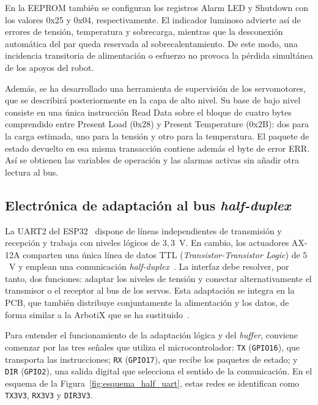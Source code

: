 En la EEPROM también se configuran los registros Alarm LED y Shutdown con los
valores 0x25 y 0x04,
respectivamente. El indicador luminoso advierte así de errores de tensión,
temperatura y sobrecarga, mientras que la desconexión automática del par queda
reservada al sobrecalentamiento. De este modo, una incidencia transitoria de
alimentación o esfuerzo no provoca la pérdida simultánea de los apoyos del
robot.

Además, se ha desarrollado una herramienta de supervisión de los servomotores,
que se describirá posteriormente en la capa de alto nivel. Su base de bajo nivel
consiste en una única instrucción Read Data sobre el bloque de cuatro bytes
comprendido entre Present Load (0x28) y Present Temperature (0x2B): dos para la
carga estimada, uno para la tensión y otro para la temperatura. El paquete de
estado devuelto en esa misma transacción contiene además el byte de error ERR.
Así se obtienen las variables de operación y las alarmas activas sin añadir otra
lectura al bus.

\subsection{Electrónica de adaptación al bus \textit{half-duplex}}
\label{subsec:hw_half_duplex}

La UART2 del ESP32~\cite{esp32_datasheet} dispone de líneas independientes de
transmisión y recepción y trabaja con niveles lógicos de $3{,}3$~V. En cambio,
los actuadores AX-12A comparten una única línea de datos TTL (\textit{Transistor-Transistor Logic}) de $5$~V y emplean
una comunicación \textit{half-duplex}~\cite{ax12a_specs}. La interfaz debe
resolver, por tanto, dos funciones: adaptar los niveles de tensión y conectar
alternativamente el transmisor o el receptor al bus de los servos. Esta
adaptación se integra en la PCB, que también
distribuye conjuntamente la alimentación y los datos, de forma similar a la
ArbotiX que se ha sustituido~\cite{arbotix_controller}.

Para entender el funcionamiento de la adaptación lógica y del \textit{buffer},
conviene comenzar por las tres señales que utiliza el microcontrolador:
\texttt{TX} (\texttt{GPIO16}), que transporta las instrucciones; \texttt{RX}
(\texttt{GPIO17}), que recibe los paquetes de estado; y \texttt{DIR}
(\texttt{GPIO2}), una salida digital que selecciona el sentido de la
comunicación. En el esquema de la Figura~\ref{fig:esquema_half_uart}, estas
redes se identifican como \texttt{TX3V3}, \texttt{RX3V3} y \texttt{DIR3V3}.

